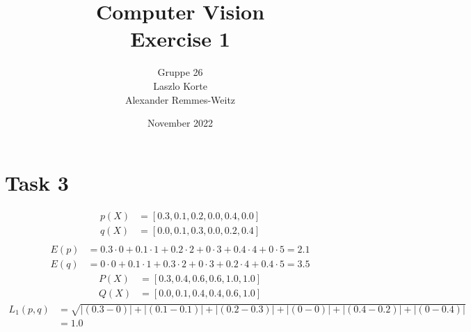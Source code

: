 \documentclass{article}
\title{Computer Vision\\Exercise 1}
\author{Gruppe 26\\Laszlo Korte\\Alexander Remmes-Weitz
}
\date{November 2022}
\begin{document}
\maketitle

\section*{Task 3}

\begin{align*}
p(X) &= [0.3, 0.1, 0.2, 0.0, 0.4, 0.0]\\
q(X) &= [0.0, 0.1, 0.3, 0.0, 0.2, 0.4]\\
\end{align*}
\begin{align*}
E(p) &= 0.3 \cdot 0 + 0.1 \cdot 1 + 0.2 \cdot 2 + 0 \cdot 3 + 0.4 \cdot 4 + 0 \cdot 5 = 2.1\\
E(q) &= 0 \cdot 0 + 0.1 \cdot 1 + 0.3 \cdot 2 + 0 \cdot 3 + 0.2 \cdot 4 + 0.4 \cdot 5 = 3.5
\end{align*}
\begin{align*}
P(X) &= [0.3, 0.4, 0.6, 0.6, 1.0, 1.0]\\
Q(X) &= [0.0, 0.1, 0.4, 0.4, 0.6, 1.0]
\end{align*}
\begin{align*}
L_1(p,q) &= \sqrt{|(0.3-0)| + |(0.1-0.1)| + |(0.2-0.3)| + |(0-0)| + |(0.4-0.2)| + |(0-0.4)|}\\
&= 1.0
\end{align*}
\end{document}
